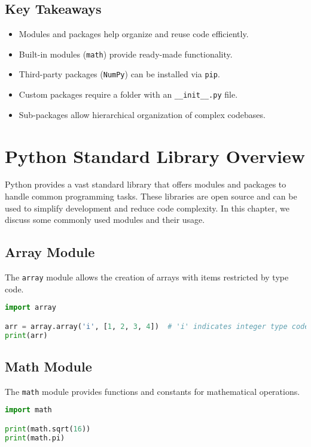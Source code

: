 \section{Key Takeaways}
\begin{itemize}
    \item Modules and packages help organize and reuse code efficiently.
    \item Built-in modules (\texttt{math}) provide ready-made functionality.
    \item Third-party packages (\texttt{NumPy}) can be installed via \texttt{pip}.
    \item Custom packages require a folder with an \texttt{\_\_init\_\_.py} file.
    \item Sub-packages allow hierarchical organization of complex codebases.
\end{itemize}

\chapter{Python Standard Library Overview}

Python provides a vast standard library that offers modules and packages to handle common programming tasks. These libraries are open source and can be used to simplify development and reduce code complexity. In this chapter, we discuss some commonly used modules and their usage.

\section{Array Module}

The \texttt{array} module allows the creation of arrays with items restricted by type code.

\begin{lstlisting}[language=Python]
import array

arr = array.array('i', [1, 2, 3, 4])  # 'i' indicates integer type code
print(arr)
\end{lstlisting}

\section{Math Module}

The \texttt{math} module provides functions and constants for mathematical operations.

\begin{lstlisting}[language=Python]
import math

print(math.sqrt(16))
print(math.pi)
\end{lstlisting}

